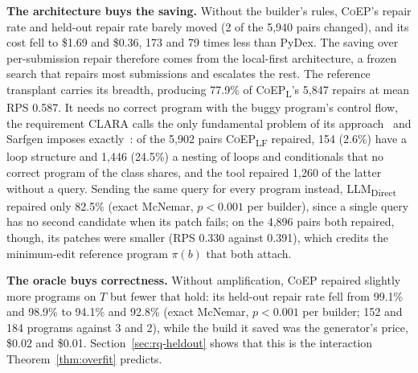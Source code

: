\documentclass[acmsmall,screen,review,anonymous,nonacm]{acmart}
\newcommand{\tool}{\textsc{CoEP}\xspace}
\newcommand{\coepL}{\textsc{CoEP}\textsubscript{L}\xspace}
\newcommand{\coepLF}{\textsc{CoEP}\textsubscript{LF}\xspace}
\newcommand{\direct}{LLM\textsubscript{Direct}\xspace}
\begin{document}
\textbf{The architecture buys the saving.} Without the builder's rules, \tool's repair rate and held-out repair rate barely moved (2 of the 5{,}940 pairs changed), and its cost fell to \$1.69 and \$0.36, 173 and 79 times less than PyDex. The saving over per-submission repair therefore comes from the local-first architecture, a frozen search that repairs most submissions and escalates the rest. The reference transplant carries its breadth, producing 77.9\% of \coepL's 5{,}847 repairs at mean RPS 0.587. It needs no correct program with the buggy program's control flow, the requirement CLARA calls the only fundamental problem of its approach~\cite{gulwani2018automated} and Sarfgen imposes exactly~\cite{wang2018search}: of the 5{,}902 pairs \coepLF repaired, 154 (2.6\%) have a loop structure and 1{,}446 (24.5\%) a nesting of loops and conditionals that no correct program of the class shares, and the tool repaired 1{,}260 of the latter without a query. Sending the same query for every program instead, \direct repaired only 82.5\% (exact McNemar, $p < 0.001$ per builder), since a single query has no second candidate when its patch fails; on the 4{,}896 pairs both repaired, though, its patches were smaller (RPS 0.330 against 0.391), which credits the minimum-edit reference program $\pi(b)$ that both attach.

\textbf{The oracle buys correctness.} Without amplification, \tool repaired slightly more programs on $T$ but fewer that hold: its held-out repair rate fell from 99.1\% and 98.9\% to 94.1\% and 92.8\% (exact McNemar, $p < 0.001$ per builder; 152 and 184 programs against 3 and 2), while the build it saved was the generator's price, \$0.02 and \$0.01. Section~\ref{sec:rq-heldout} shows that this is the interaction Theorem~\ref{thm:overfit} predicts.
\end{document}
